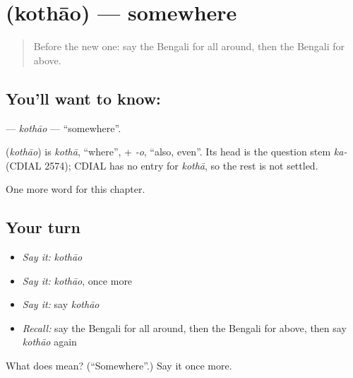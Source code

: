 \section[\texorpdfstring{\bn{কোথাও} (kothāo)}{কোথাও (kothāo)}]{ (kothāo) — somewhere}

\label{lesson:BN-C216-kothao}



\begin{quote}
Before the new one: say the Bengali for all around, then the Bengali for above.
\end{quote}

\subsection*{You'll want to know: }
\textbf{} — \emph{kothāo} — \textquotedblleft{}somewhere\textquotedblright{}.

\begin{cousinweb}
\textbf{} (\emph{kothāo}) is \emph{kothā}, \textquotedblleft{}where\textquotedblright{}, + \emph{-o}, \textquotedblleft{}also, even\textquotedblright{}. Its head is the question stem \emph{ka-} (CDIAL 2574); CDIAL has no entry for \emph{kothā}, so the rest is not settled.
\end{cousinweb}

\begin{grammarlens}[title={What you've built}]
One more word for this chapter.
\end{grammarlens}

\subsection*{Your turn}
\begin{itemize}
\raggedright
  \item \emph{Say it:} \emph{kothāo}
  \item \emph{Say it:} \emph{kothāo}, once more
  \item \emph{Say it:} say \emph{kothāo}
  \item \emph{Recall:} say the Bengali for all around, then the Bengali for above, then say \emph{kothāo} again
\end{itemize}

\begin{tcolorbox}[breakable,colback=teal!4,colframe=teal!35!black,title={Before you move on}]
What does  mean? (\textquotedblleft{}Somewhere\textquotedblright{}.) Say it once more.
\end{tcolorbox}
